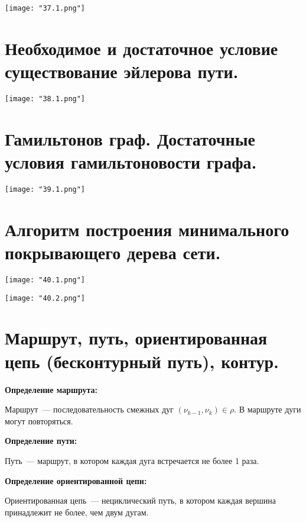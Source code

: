\begin{center}
    \texttt{[image: "37.1.png"]}
\end{center}

\section{Необходимое и достаточное условие существование эйлерова пути.}

\begin{center}
    \texttt{[image: "38.1.png"]}
\end{center}

\section{Гамильтонов граф. Достаточные условия гамильтоновости графа.}

\begin{center}
    \texttt{[image: "39.1.png"]}
\end{center}

\section{Алгоритм построения минимального покрывающего дерева сети.}

\begin{center}
    \texttt{[image: "40.1.png"]}
    \bigskip

    \texttt{[image: "40.2.png"]}
\end{center}

\section{Маршрут, путь, ориентированная цепь (бесконтурный путь), контур.}

\textbf{Определение маршрута:}
    \smallskip

    Маршрут~--- последовательность смежных дуг $(\nu_{k - 1}, \nu_k) \in \rho$.
    В маршруте дуги могут повторяться.
    \bigskip

\textbf{Определение пути:}
    \smallskip
    
    Путь~--- маршрут, в котором каждая дуга встречается не более 1 раза.
    \bigskip

\textbf{Определение ориентированной цепи:}
    \smallskip
    
    Ориентированная цепь~--- нециклический путь, в котором
    каждая вершина принадлежит не более, чем двум дугам.
    \bigskip

